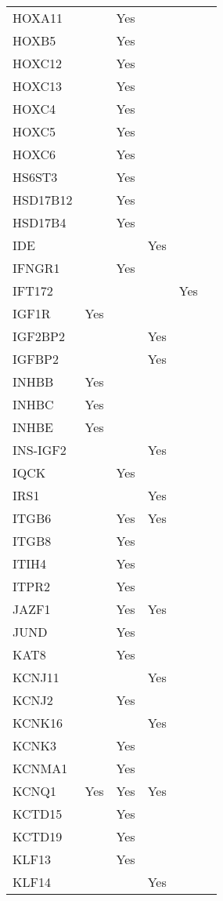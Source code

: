 \documentclass[]{report}
\begin{document}
\begin{longtable}[t]{llllll}
HOXA11 &  & Yes &  &  & \\
HOXB5 &  & Yes &  &  & \\
HOXC12 &  & Yes &  &  & \\
HOXC13 &  & Yes &  &  & \\
HOXC4 &  & Yes &  &  & \\
HOXC5 &  & Yes &  &  & \\
HOXC6 &  & Yes &  &  & \\
HS6ST3 &  & Yes &  &  & \\
HSD17B12 &  & Yes &  &  & \\
HSD17B4 &  & Yes &  &  & \\
IDE &  &  & Yes &  & \\
IFNGR1 &  & Yes &  &  & \\
IFT172 &  &  &  & Yes & \\
IGF1R & Yes &  &  &  & \\
IGF2BP2 &  &  & Yes &  & \\
IGFBP2 &  &  & Yes &  & \\
INHBB & Yes &  &  &  & \\
INHBC & Yes &  &  &  & \\
INHBE & Yes &  &  &  & \\
INS-IGF2 &  &  & Yes &  & \\
IQCK &  & Yes &  &  & \\
IRS1 &  &  & Yes &  & \\
ITGB6 &  & Yes & Yes &  & \\
ITGB8 &  & Yes &  &  & \\
ITIH4 &  & Yes &  &  & \\
ITPR2 &  & Yes &  &  & \\
JAZF1 &  & Yes & Yes &  & \\
JUND &  & Yes &  &  & \\
KAT8 &  & Yes &  &  & \\
KCNJ11 &  &  & Yes &  & \\
KCNJ2 &  & Yes &  &  & \\
KCNK16 &  &  & Yes &  & \\
KCNK3 &  & Yes &  &  & \\
KCNMA1 &  & Yes &  &  & \\
KCNQ1 & Yes & Yes & Yes &  & \\
KCTD15 &  & Yes &  &  & \\
KCTD19 &  & Yes &  &  & \\
KLF13 &  & Yes &  &  & \\
KLF14 &  &  & Yes &  & \\

\end{longtable}
\end{document}
